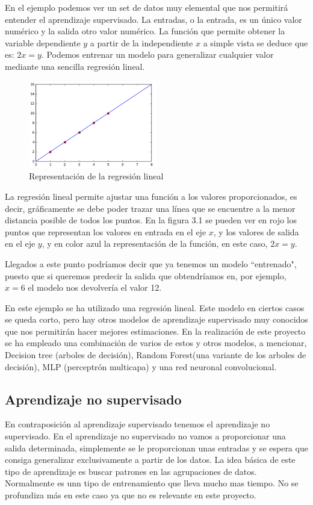 En el ejemplo podemos ver un set de datos muy elemental que nos permitirá entender el aprendizaje supervisado. La entradas, o la entrada, es un único valor numérico y la salida otro valor numérico. La función que permite obtener la variable dependiente $y$ a partir de la independiente $x$ a simple vista se deduce que es: $2x = y$. Podemos entrenar un modelo para generalizar cualquier valor mediante una sencilla regresión lineal.

\begin{figure}[h]
  \centering
    \includegraphics[width=0.5\textwidth]{../img/supervisado_grafica_1}
  \caption{Representación de la regresión lineal}
  \label{fig:ejemplo}
\end{figure}

La regresión lineal permite ajustar una función a los valores proporcionados, es decir, gráficamente se debe poder trazar una línea que se encuentre a la menor distancia posible de todos los puntos. En la figura 3.1 se pueden ver en rojo los puntos que representan los valores en entrada en el eje $x$, y los valores de salida en el eje $y$, y en color azul la representación de la función, en este caso, $2x = y$.

Llegados a este punto podríamos decir que ya tenemos un modelo ``entrenado", puesto que si queremos predecir la salida que obtendríamos en, por ejemplo, $x=6$ el modelo nos devolvería el valor 12.

En este ejemplo se ha utilizado una regresión lineal. Este modelo en ciertos casos se queda corto, pero hay otros modelos de aprendizaje supervisado muy conocidos que nos permitirán hacer mejores estimaciones. En la realización de este proyecto se ha empleado una combinación de varios de estos y otros modelos, a mencionar, Decision tree (arboles de decisión), Random Forest(una variante de los arboles de decisión), MLP (perceptrón multicapa) y una red neuronal convolucional.

\subsection{Aprendizaje no supervisado}
En contraposición al aprendizaje supervisado tenemos el aprendizaje no supervisado. En el aprendizaje no supervisado no vamos a proporcionar una salida determinada, simplemente se le proporcionan unas entradas y se espera que consiga generalizar exclusivamente a partir de los datos. La idea básica de este tipo de aprendizaje es buscar patrones en las agrupaciones de datos. Normalmente es unn tipo de entrenamiento que lleva mucho mas tiempo. No se profundiza más en este caso ya que no es relevante en este proyecto.

